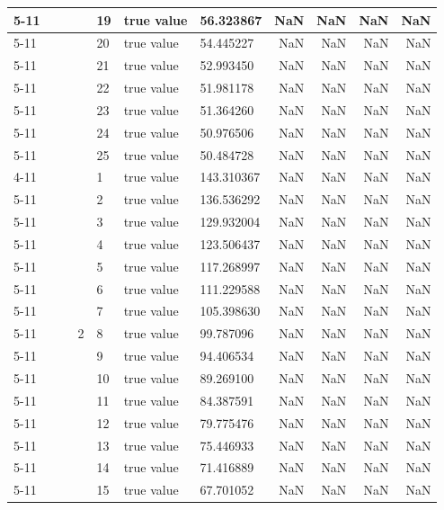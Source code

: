 \begin{tabular}{lllllllrrrr}
\cline{5-11}
 &  &  &  & 19 & true value & 56.323867 & NaN & NaN & NaN & NaN \\
\cline{5-11}
 &  &  &  & 20 & true value & 54.445227 & NaN & NaN & NaN & NaN \\
\cline{5-11}
 &  &  &  & 21 & true value & 52.993450 & NaN & NaN & NaN & NaN \\
\cline{5-11}
 &  &  &  & 22 & true value & 51.981178 & NaN & NaN & NaN & NaN \\
\cline{5-11}
 &  &  &  & 23 & true value & 51.364260 & NaN & NaN & NaN & NaN \\
\cline{5-11}
 &  &  &  & 24 & true value & 50.976506 & NaN & NaN & NaN & NaN \\
\cline{5-11}
 &  &  &  & 25 & true value & 50.484728 & NaN & NaN & NaN & NaN \\
\cline{4-11} \cline{5-11}
 &  &  & \multirow[t]{25}{*}{2} & 1 & true value & 143.310367 & NaN & NaN & NaN & NaN \\
\cline{5-11}
 &  &  &  & 2 & true value & 136.536292 & NaN & NaN & NaN & NaN \\
\cline{5-11}
 &  &  &  & 3 & true value & 129.932004 & NaN & NaN & NaN & NaN \\
\cline{5-11}
 &  &  &  & 4 & true value & 123.506437 & NaN & NaN & NaN & NaN \\
\cline{5-11}
 &  &  &  & 5 & true value & 117.268997 & NaN & NaN & NaN & NaN \\
\cline{5-11}
 &  &  &  & 6 & true value & 111.229588 & NaN & NaN & NaN & NaN \\
\cline{5-11}
 &  &  &  & 7 & true value & 105.398630 & NaN & NaN & NaN & NaN \\
\cline{5-11}
 &  &  &  & 8 & true value & 99.787096 & NaN & NaN & NaN & NaN \\
\cline{5-11}
 &  &  &  & 9 & true value & 94.406534 & NaN & NaN & NaN & NaN \\
\cline{5-11}
 &  &  &  & 10 & true value & 89.269100 & NaN & NaN & NaN & NaN \\
\cline{5-11}
 &  &  &  & 11 & true value & 84.387591 & NaN & NaN & NaN & NaN \\
\cline{5-11}
 &  &  &  & 12 & true value & 79.775476 & NaN & NaN & NaN & NaN \\
\cline{5-11}
 &  &  &  & 13 & true value & 75.446933 & NaN & NaN & NaN & NaN \\
\cline{5-11}
 &  &  &  & 14 & true value & 71.416889 & NaN & NaN & NaN & NaN \\
\cline{5-11}
 &  &  &  & 15 & true value & 67.701052 & NaN & NaN & NaN & NaN \\

\end{tabular}
